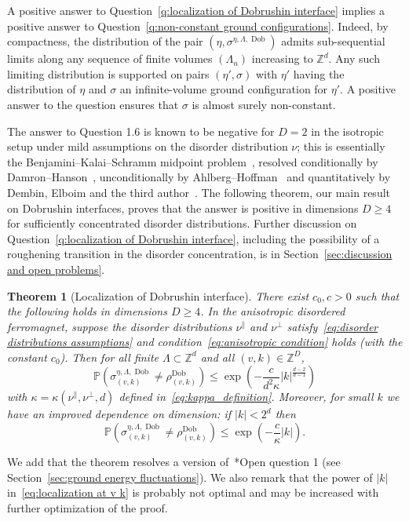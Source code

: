 \documentclass[11pt, reqno]{amsart}
\newtheorem{theorem}{Theorem}[section]
\newcommand{\Z}{\mathbb{Z}}
\DeclareMathOperator{\Dob}{Dob}
\renewcommand{\P}{\mathbb{P}}
\numberwithin{equation}{section}
\begin{document}
A positive answer to Question~\ref{q:localization of Dobrushin interface} implies a positive answer to Question~\ref{q:non-constant ground configurations}. Indeed, by compactness, the distribution of the pair $(\eta, \sigma^{\eta,\Lambda,\Dob})$ admits sub-sequential limits along any sequence of finite volumes $(\Lambda_n)$ increasing to $\Z^d$. Any such limiting distribution is supported on pairs $(\eta', \sigma)$ with $\eta'$ having the distribution of $\eta$ and $\sigma$ an infinite-volume ground configuration for $\eta'$. A positive answer to the question ensures that $\sigma$ is almost surely non-constant.

The answer to Question 1.6 is known to be negative for $D=2$ in the isotropic setup under mild assumptions on the disorder distribution $\nu$; this is essentially the Benjamini--Kalai--Schramm midpoint problem~\cite{BKS03}, resolved conditionally by Damron--Hanson~\cite{DH17}, unconditionally by Ahlberg--Hoffman~\cite{AH16} and quantitatively by Dembin, Elboim and the third author~\cite{DEP22}. The following theorem, our main result on Dobrushin interfaces, proves that the answer is positive in dimensions $D\ge 4$ for sufficiently concentrated disorder distributions. 
Further discussion on Question~\ref{q:localization of Dobrushin interface}, including the possibility of a roughening transition in the disorder concentration, is in Section~\ref{sec:discussion and open problems}.

\begin{theorem}[Localization of Dobrushin interface]\label{thm:localization}
There exist $c_0,c>0$ such that the following holds in dimensions $D\ge 4$. In the anisotropic disordered ferromagnet, suppose the disorder distributions $\nu^\parallel$ and $\nu^\perp$ satisfy~\eqref{eq:disorder distributions assumptions} and condition~\eqref{eq:anisotropic condition} holds (with the constant $c_0$). Then for all finite $\Lambda\subset\Z^d$ and all $(v,k)\in \Z^{D}$,
\begin{equation}\label{eq:localization at v k}
\P\left(\sigma^{\eta,\Lambda,\Dob}_{(v,k)} \neq \rho^{\Dob}_{(v,k)}\right) \leq           
\exp\left(-\frac{c}{d^2 \kappa}  |k|^{\frac{d-2}{d-1}}\right)
\end{equation}
with $\kappa=\kappa(\nu^\parallel, \nu^\perp,d)$ defined in~\eqref{eq:kappa_definition}.
Moreover, for small $k$ we have an improved dependence on dimension: 
if $ |k| < 2^d$ then 
\begin{equation}
\P\left(\sigma^{\eta,\Lambda,\Dob}_{(v,k)} \neq \rho^{\Dob}_{(v,k)}\right) \leq \exp\left(-\frac{c}{\kappa} |k| \right).
\end{equation}
\end{theorem}
We add that the theorem resolves a version of~\cite{DG23}*{Open question 1} (see Section~\ref{sec:ground energy fluctuations}). We also remark that the power of $|k|$ in~\eqref{eq:localization at v k} is probably not optimal and may be increased with further optimization of the proof.
\end{document}
